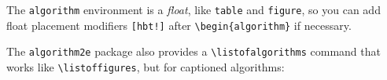 \documentclass[11pt]{article}
\begin{document}
The \verb|algorithm| environment is a \emph{float}, like \verb|table| and \verb|figure|, so you can add float placement modifiers \verb|[hbt!]| after \verb|\begin{algorithm}| if necessary.

\begin{algorithm}[hbt!]
\caption{Bubble Sort Algorithm}\label{alg:bubble_sort}
\end{algorithm}

The \verb|algorithm2e| package also provides a \verb|\listofalgorithms| command that works like \verb|\listoffigures|, but for captioned algorithms:

\listofalgorithms
\end{document}
